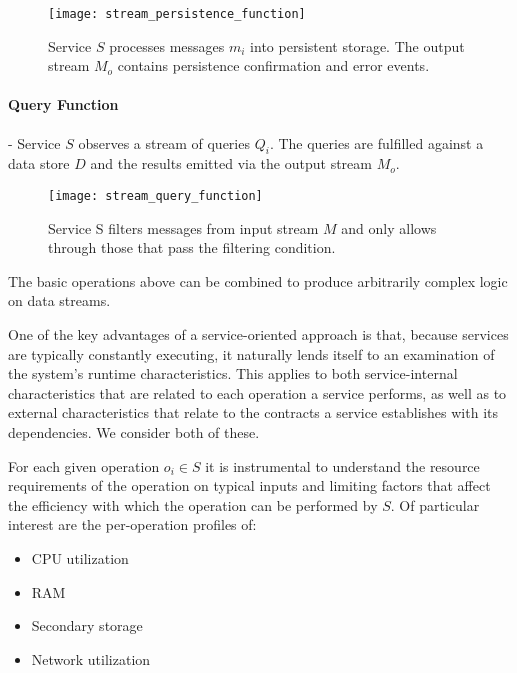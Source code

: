 \begin{figure}[H]
\texttt{[image: stream\_persistence\_function]}
\centering
\caption {Service $S$ processes messages $m_i$ into persistent storage. The output stream $M_o$ contains persistence confirmation and error events.}
\label{fig:stream_persistence_function}
\end{figure}

\paragraph{Query Function} - Service $S$ observes a stream of queries $Q_i$. The queries are fulfilled against a data store $D$ and the results emitted via the output stream $M_o$.

\begin{figure}[H]
\texttt{[image: stream\_query\_function]}
\centering
\caption {Service S filters messages from input stream $M$ and only allows through those that pass the filtering condition.}
\label{fig:stream_query_function}
\end{figure}

The basic operations above can be combined to produce arbitrarily complex logic on data streams.

One of the key advantages of a service-oriented approach is that, because services are typically constantly executing, it naturally lends itself to an examination of the system's runtime characteristics. This applies to both service-internal characteristics that are related to each operation a service performs, as well as to external characteristics that relate to the contracts a service establishes with its dependencies. We consider both of these.

For each given operation $o_i \in S$ it is instrumental to understand the resource requirements of the operation on typical inputs and limiting factors that affect the efficiency with which the operation can be performed by $S$. Of particular interest are the per-operation profiles of:

\begin{itemize}
    \item CPU utilization
    \item RAM
    \item Secondary storage
    \item Network utilization
\end{itemize}

